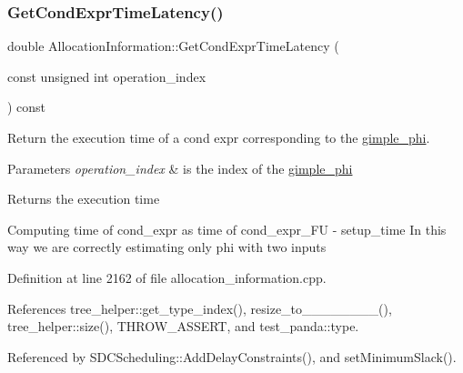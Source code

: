 \subsubsection{\texorpdfstring{Get\+Cond\+Expr\+Time\+Latency()}{GetCondExprTimeLatency()}}
{\footnotesize\ttfamily double Allocation\+Information\+::\+Get\+Cond\+Expr\+Time\+Latency (\begin{DoxyParamCaption}\item[{const unsigned int}]{operation\+\_\+index }\end{DoxyParamCaption}) const}



Return the execution time of a cond expr corresponding to the \hyperlink{structgimple__phi}{gimple\+\_\+phi}. 


\begin{DoxyParams}{Parameters}
{\em operation\+\_\+index} & is the index of the \hyperlink{structgimple__phi}{gimple\+\_\+phi} \\
\hline
\end{DoxyParams}
\begin{DoxyReturn}{Returns}
the execution time 
\end{DoxyReturn}
Computing time of cond\+\_\+expr as time of cond\+\_\+expr\+\_\+\+FU -\/ setup\+\_\+time In this way we are correctly estimating only phi with two inputs 

Definition at line 2162 of file allocation\+\_\+information.\+cpp.



References tree\+\_\+helper\+::get\+\_\+type\+\_\+index(), resize\+\_\+to\+\_\+\_\+\_\+\_\+\_\+\_\+\_\+\_(), tree\+\_\+helper\+::size(), T\+H\+R\+O\+W\+\_\+\+A\+S\+S\+E\+RT, and test\+\_\+panda\+::type.



Referenced by S\+D\+C\+Scheduling\+::\+Add\+Delay\+Constraints(), and set\+Minimum\+Slack().

